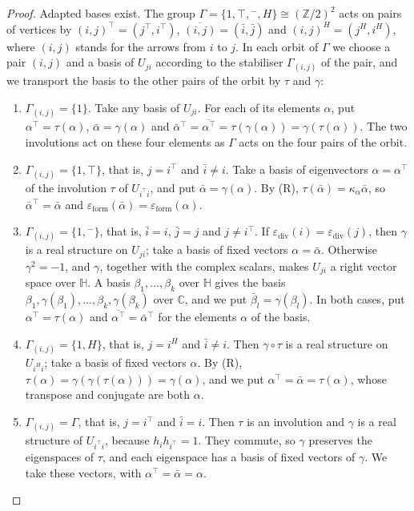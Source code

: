 \documentclass[12pt, a4paper]{report}
\theoremstyle{plain}
\theoremstyle{definition}
\theoremstyle{remark}
\theoremstyle{plain}
\newcommand{\epsilondiv}{\varepsilon_{\mathrm{div}}}
\newcommand{\epsilonform}{\varepsilon_{\mathrm{form}}}
\newcommand{\CC}{\mathbb{C}}
\newcommand{\HH}{\mathbb{H}}
\newcommand{\ZZ}{\mathbb{Z}}
\begin{document}
\begin{proof}
Adapted bases exist. The group $\Gamma=\{1,\top,{}^-,H\}\cong(\ZZ/2)^2$ acts on pairs of vertices by $(i,j)^{\top}=(j^{\top},i^{\top})$, $\overline{(i,j)}=(\bar i,\bar j)$ and $(i,j)^H=(j^H,i^H)$, where $(i,j)$ stands for the arrows from $i$ to $j$. In each orbit of $\Gamma$ we choose a pair $(i,j)$ and a basis of $U_{ji}$ according to the stabiliser $\Gamma_{(i,j)}$ of the pair, and we transport the basis to the other pairs of the orbit by $\tau$ and $\gamma$:
\begin{enumerate}
  \item[(a)] $\Gamma_{(i,j)}=\{1\}$. Take any basis of $U_{ji}$. For each of its elements $\alpha$, put $\alpha^{\top}=\tau(\alpha)$, $\bar\alpha=\gamma(\alpha)$ and $\bar\alpha^{\top}=\overline{\alpha^{\top}}=\tau(\gamma(\alpha))=\gamma(\tau(\alpha))$. The two involutions act on these four elements as $\Gamma$ acts on the four pairs of the orbit.
  \item[(b)] $\Gamma_{(i,j)}=\{1,\top\}$, that is, $j=i^{\top}$ and $\bar i\neq i$. Take a basis of eigenvectors $\alpha=\alpha^{\top}$ of the involution $\tau$ of $U_{i^{\top}i}$, and put $\bar\alpha=\gamma(\alpha)$. By (R), $\tau(\bar\alpha)=\kappa_\alpha\bar\alpha$, so $\bar\alpha^{\top}=\bar\alpha$ and $\epsilonform(\bar\alpha)=\epsilonform(\alpha)$.
  \item[(c)] $\Gamma_{(i,j)}=\{1,{}^-\}$, that is, $\bar i=i$, $\bar j=j$ and $j\neq i^{\top}$. If $\epsilondiv(i)=\epsilondiv(j)$, then $\gamma$ is a real structure on $U_{ji}$; take a basis of fixed vectors $\alpha=\bar\alpha$. Otherwise $\gamma^2=-1$, and $\gamma$, together with the complex scalars, makes $U_{ji}$ a right vector space over $\HH$. A basis $\beta_1,\dots,\beta_k$ over $\HH$ gives the basis $\beta_1,\gamma(\beta_1),\dots,\beta_k,\gamma(\beta_k)$ over $\CC$, and we put $\bar\beta_l=\gamma(\beta_l)$. In both cases, put $\alpha^{\top}=\tau(\alpha)$ and $\overline{\alpha^{\top}}=\bar\alpha^{\top}$ for the elements $\alpha$ of the basis.
  \item[(d)] $\Gamma_{(i,j)}=\{1,H\}$, that is, $j=i^H$ and $\bar i\neq i$. Then $\gamma\circ\tau$ is a real structure on $U_{i^Hi}$; take a basis of fixed vectors $\alpha$. By (R), $\tau(\alpha)=\gamma(\gamma(\tau(\alpha)))=\gamma(\alpha)$, and we put $\alpha^{\top}=\bar\alpha=\tau(\alpha)$, whose transpose and conjugate are both $\alpha$.
  \item[(e)] $\Gamma_{(i,j)}=\Gamma$, that is, $j=i^{\top}$ and $\bar i=i$. Then $\tau$ is an involution and $\gamma$ is a real structure of $U_{i^{\top}i}$, because $h_ih_{i^{\top}}=1$. They commute, so $\gamma$ preserves the eigenspaces of $\tau$, and each eigenspace has a basis of fixed vectors of $\gamma$. We take these vectors, with $\alpha^{\top}=\bar\alpha=\alpha$.

\end{enumerate}
\end{proof}
\end{document}
